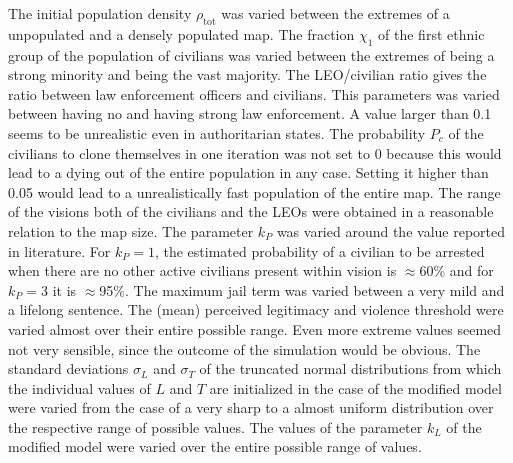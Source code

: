 \documentclass[11pt]{article}
\begin{document}
The initial population density $\rho_\textrm{tot}$ was varied between the extremes of a unpopulated and a densely populated map. The fraction $\chi_1$ of the first ethnic group of the population of civilians was varied between the extremes of being a strong minority and being the vast majority. The LEO/civilian ratio gives the ratio between law enforcement officers and civilians. This parameters was varied between having no and having strong law enforcement. A value larger than 0.1 seems to be unrealistic even in authoritarian states. The probability $P_c$ of the civilians to clone themselves in one iteration was not set to 0 because this would lead to a dying out of the entire population in any case. Setting it higher than 0.05 would lead to a unrealistically fast population of the entire map. The range of the visions both of the civilians and the LEOs were obtained in a reasonable relation to the map size. The parameter $k_P$ was varied around the value reported in literature. For $k_P = 1$, the estimated probability of a civilian to be arrested when there are no other active civilians present within vision is $\approx$60\% and for $k_P = 3$ it is $\approx$95\%. The maximum jail term was varied between a very mild and a lifelong sentence. The (mean) perceived legitimacy and violence threshold were varied almost over their entire possible range. Even more extreme values seemed not very sensible, since the outcome of the simulation would be obvious. The standard deviations $\sigma_L$ and $\sigma_T$ of the truncated normal distributions from which the individual values of $L$ and $T$ are initialized in the case of the modified model were varied from the case of a very sharp to a almost uniform distribution over the respective range of possible values. The values of the parameter $k_L$ of the modified model were varied over the entire possible range of values.
\end{document}
